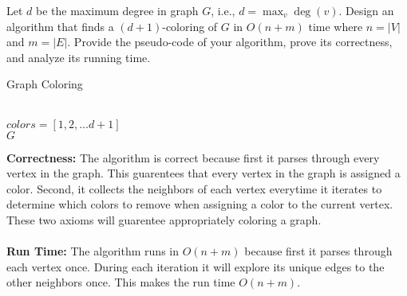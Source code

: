 \documentclass[11pt]{article}
\theoremstyle{definition}
\theoremstyle{theorem}
\begin{document}
Let $d$ be the maximum degree in graph $G$, i.e., $d = \max_v \deg(v)$. Design an algorithm that finds a $(d+1)$-coloring of $G$ in $O(n+m)$ time where $n = |V|$ and $m = |E|$. Provide the pseudo-code of your algorithm, prove its correctness, and analyze its running time.

\begin{algorithm}[H]
\caption{Graph Coloring}
 \\ {
    $colors = [1, 2, \ldots d + 1]$ \\
    \Return $G$
}
\end{algorithm}

\textbf{Correctness: } The algorithm is correct because first it parses through every vertex in the graph. This guarentees that every vertex in the graph is assigned a color. Second, it collects the neighbors of each vertex everytime it iterates to determine which colors to remove when assigning a color to the current vertex. These two axioms will guarentee appropriately coloring a graph. \\\\

\textbf{Run Time: } The algorithm runs in $O(n + m)$ because first it parses through each vertex once. During each iteration it will explore its unique edges to the other neighbors once. This makes the run time $O(n + m)$.
\end{document}

